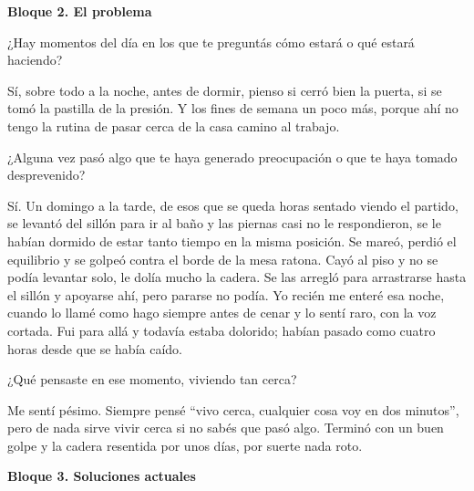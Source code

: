 \bigskip
\textbf{Bloque 2. El problema}

\begin{description}[leftmargin=0cm, labelsep=0.5cm]

    \item[\textbf{Entrevistador:}] ¿Hay momentos del día en los que te preguntás cómo estará o qué estará haciendo?

    \item[\textbf{Entrevistado:}] Sí, sobre todo a la noche, antes de dormir, pienso si cerró bien la puerta, si se tomó la pastilla de la presión.
    Y los fines de semana un poco más, porque ahí no tengo la rutina de pasar cerca de la casa camino al trabajo.

    \item[\textbf{Entrevistador:}] ¿Alguna vez pasó algo que te haya generado preocupación o que te haya tomado desprevenido?

    \item[\textbf{Entrevistado:}] Sí.
    Un domingo a la tarde, de esos que se queda horas sentado viendo el partido, se levantó del sillón para ir al baño y las piernas casi no le respondieron, se le habían dormido de estar tanto tiempo en la misma posición.
    Se mareó, perdió el equilibrio y se golpeó contra el borde de la mesa ratona.
    Cayó al piso y no se podía levantar solo, le dolía mucho la cadera.
    Se las arregló para arrastrarse hasta el sillón y apoyarse ahí, pero pararse no podía.
    Yo recién me enteré esa noche, cuando lo llamé como hago siempre antes de cenar y lo sentí raro, con la voz cortada.
    Fui para allá y todavía estaba dolorido; habían pasado como cuatro horas desde que se había caído.

    \item[\textbf{Entrevistador:}] ¿Qué pensaste en ese momento, viviendo tan cerca?

    \item[\textbf{Entrevistado:}] Me sentí pésimo.
    Siempre pensé ``vivo cerca, cualquier cosa voy en dos minutos'', pero de nada sirve vivir cerca si no sabés que pasó algo.
    Terminó con un buen golpe y la cadera resentida por unos días, por suerte nada roto.

\end{description}

\bigskip
\textbf{Bloque 3. Soluciones actuales}

